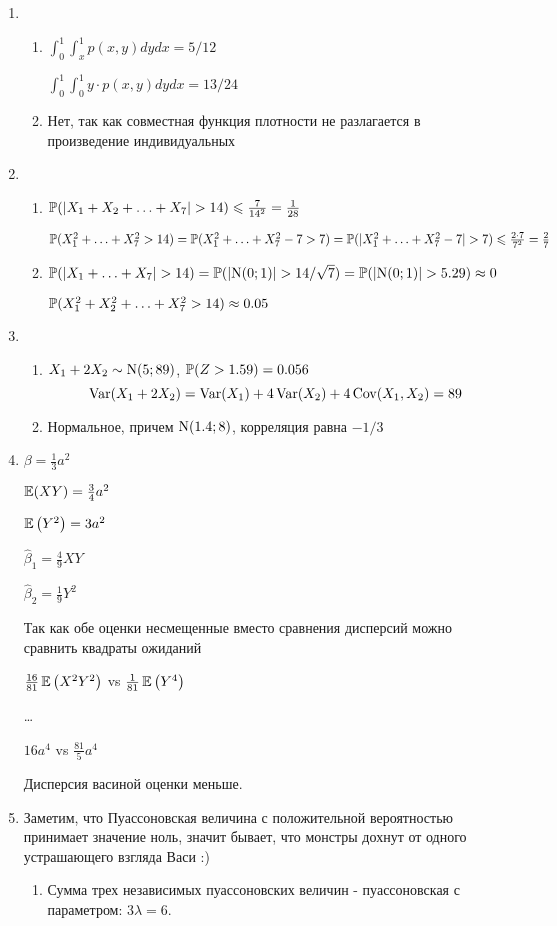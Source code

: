 \begin{enumerate}
\item
\begin{enumerate}
\item $\int_{0}^{1}\int_{x}^{1}p(x,y)dydx = 5/12$

$\int_{0}^{1}\int_{0}^{1}y\cdot p(x,y)dydx = 13/24$
\item Нет, так как совместная функция плотности не разлагается в произведение
индивидуальных
\end{enumerate}
\item
\begin{enumerate}
\item $\P(|X_{1}+X_{2}+ \ldots +X_{7}|>14)\leq \frac{7}{14^2}=\frac{1}{28}$

$\P(X_{1}^{2} + \ldots + X_{7}^{2} > 14) = \P(X_{1}^{2} + \ldots + X_{7}^{2} - 7 > 7)
= \P(|X_{1}^{2} + \ldots + X_{7}^{2} - 7| > 7) \leq \frac{2 \cdot 7}{7^2} = \frac{2}{7}$
\item $\P(|X_{1} + \ldots + X_{7}| > 14) = \P(|\cN(0;1)| > 14/\sqrt{7}) = \P(|\cN(0;1)| > 5.29) \approx 0$

$\P(X_{1}^{2} + X_{2}^{2} + \ldots + X_{7}^{2} > 14) \approx 0.05$
\end{enumerate}
\item
\begin{enumerate}
\item $X_{1} + 2X_{2} \sim \cN(5;89)$, $\P(Z > 1.59) = 0.056$
\[
\Var(X_1 + 2X_2) = \Var(X_1) + 4\Var(X_2) + 4\Cov(X_1, X_2) = 89
\]
\item Нормальное, причем $\cN(1.4;8)$, корреляция равна $-1/3$
\end{enumerate}
\item $\beta = \frac{1}{3}a^{2}$

$\E(XY) = \frac{3}{4}a^{2}$

$\E\left(Y^{2}\right) = 3a^{2}$

$\hat{\beta}_{1} = \frac{4}{9}XY$

$\hat{\beta}_{2} = \frac{1}{9}Y^{2}$

Так как обе оценки несмещенные вместо сравнения дисперсий можно сравнить квадраты
ожиданий

$\frac{16}{81}\E\left(X^{2}Y^{2}\right)$ vs $\frac{1}{81}\E\left(Y^{4}\right)$

\ldots

$16 a^4$ vs $\frac{81}{5} a^{4}$

Дисперсия васиной оценки меньше.
\item Заметим, что Пуассоновская величина с положительной вероятностью принимает
значение ноль, значит бывает, что монстры дохнут от одного устрашающего взгляда Васи :)
\begin{enumerate}
\item Сумма трех независимых пуассоновских величин - пуассоновская с параметром: $3\lambda=6$.


\end{enumerate}
\end{enumerate}

